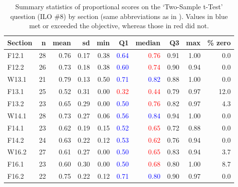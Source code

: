 \documentclass{article}\usepackage[]{graphicx}\usepackage[]{color}
\begin{document}
\begin{table}[h]
\centering
\caption{Summary statistics of proportional scores on the `Two-Sample t-Test' question (ILO \#8) by section (same abbreviations as in ). Values in blue met or exceeded the objective, whereas those in red did not.} 
\label{tab:sumT2}
\begin{tabular}{lrrrrrrrrr}
  \hline
Section & n & mean & sd & min & \textbf{Q1} & \textbf{median} & Q3 & max & \% zero \\ 
  \hline
F12.1 & 28 & 0.76 & 0.17 & 0.38 & \textcolor{red}{\textcolor{blue}{0.64}} & \textcolor{red}{                   0.76} & 0.91 & 1.00 & 0.0 \\ 
  F12.2 & 26 & 0.73 & 0.18 & 0.38 & \textcolor{red}{\textcolor{blue}{0.60}} & \textcolor{red}{                   0.74} & 0.90 & 0.94 & 0.0 \\ 
  W13.1 & 21 & 0.79 & 0.13 & 0.50 & \textcolor{red}{\textcolor{blue}{0.71}} & \textcolor{red}{\textcolor{blue}{0.82}} & 0.88 & 1.00 & 0.0 \\ 
  F13.1 & 25 & 0.52 & 0.31 & 0.00 & \textcolor{red}{                   0.32} & \textcolor{red}{                   0.44} & 0.79 & 0.97 & 12.0 \\ 
  F13.2 & 23 & 0.65 & 0.29 & 0.00 & \textcolor{red}{\textcolor{blue}{0.50}} & \textcolor{red}{                   0.76} & 0.82 & 0.97 & 4.3 \\ 
  W14.1 & 28 & 0.73 & 0.27 & 0.06 & \textcolor{red}{\textcolor{blue}{0.56}} & \textcolor{red}{\textcolor{blue}{0.84}} & 0.94 & 1.00 & 0.0 \\ 
  F14.1 & 23 & 0.62 & 0.19 & 0.15 & \textcolor{red}{\textcolor{blue}{0.52}} & \textcolor{red}{                   0.65} & 0.72 & 0.88 & 0.0 \\ 
  F14.2 & 24 & 0.63 & 0.22 & 0.12 & \textcolor{red}{\textcolor{blue}{0.53}} & \textcolor{red}{                   0.62} & 0.76 & 0.94 & 0.0 \\ 
  W16.2 & 27 & 0.61 & 0.27 & 0.00 & \textcolor{red}{\textcolor{blue}{0.50}} & \textcolor{red}{                   0.65} & 0.83 & 0.94 & 3.7 \\ 
  F16.1 & 23 & 0.60 & 0.30 & 0.00 & \textcolor{red}{\textcolor{blue}{0.50}} & \textcolor{red}{                   0.68} & 0.80 & 1.00 & 8.7 \\ 
  F16.2 & 22 & 0.75 & 0.22 & 0.12 & \textcolor{red}{\textcolor{blue}{0.71}} & \textcolor{red}{\textcolor{blue}{0.80}} & 0.90 & 0.97 & 0.0 \\ 

\end{tabular}
\end{table}
\end{document}
